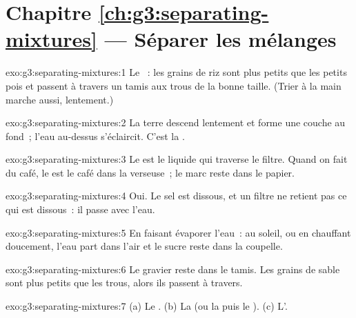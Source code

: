 \section*{Chapitre \ref{ch:g3:separating-mixtures} --- Séparer les mélanges}

\begin{solution}{exo:g3:separating-mixtures:1}
Le ~: les grains de riz sont plus petits que les petits pois et
passent à travers un tamis aux trous de la bonne taille. (Trier à la
main marche aussi, lentement.)
\end{solution}

\begin{solution}{exo:g3:separating-mixtures:2}
La terre descend lentement et forme une couche au fond~; l'eau au-dessus
s'éclaircit. C'est la .
\end{solution}

\begin{solution}{exo:g3:separating-mixtures:3}
Le  est le liquide qui traverse le filtre. Quand on fait du café,
le  est le café dans la verseuse~; le marc reste dans le papier.
\end{solution}

\begin{solution}{exo:g3:separating-mixtures:4}
Oui. Le sel est dissous, et un filtre ne retient pas ce qui est
dissous~: il passe avec l'eau.
\end{solution}

\begin{solution}{exo:g3:separating-mixtures:5}
En faisant évaporer l'eau~: au soleil, ou en chauffant doucement, l'eau
part dans l'air et le sucre reste dans la coupelle.
\end{solution}

\begin{solution}{exo:g3:separating-mixtures:6}
Le gravier reste dans le tamis. Les grains de sable sont plus petits que
les trous, alors ils passent à travers.
\end{solution}

\begin{solution}{exo:g3:separating-mixtures:7}
(a) Le . (b) La  (ou la  puis le
). (c) L'.
\end{solution}

